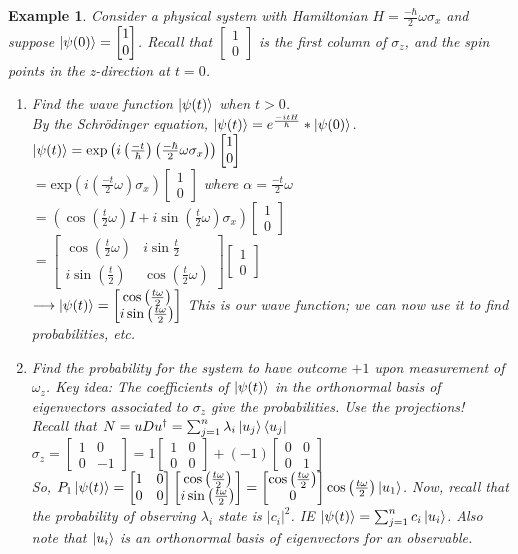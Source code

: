 \documentclass[12pt]{article}
\theoremstyle{plain}
\theoremstyle{nonumberplain}
\theoremstyle{plain}
\newtheorem{example}[lemma]{Example}
\theoremstyle{nonumberplain}
\newcommand\1{{\bf 1}}
\newcommand{\bmat}[1]{\begin{bmatrix*} #1 \end{bmatrix*}} %
\newcommand{\<}{\left\langle}
\renewcommand{\>}{\right\rangle}
\newcommand{\sinx}[1]{\sin\left(#1\right)}
\newcommand{\cosx}[1]{\cos\left(#1\right)}
\begin{document}
\begin{example}
Consider a physical system with Hamiltonian $H=\frac{-\hbar}{2}\omega\sigma_x$ and suppose $\ket{\psi(0)}=\bmat{ 1 \\ 0}$.  Recall that $\bmat{ 1 \\ 0}$ is the first column of $\sigma_z$, and the spin points in the z-direction at $t=0$.
\begin{enumerate}[label=(\alph*)]
\item Find the wave function $\ket{\psi(t)}$ when $t>0$. \\
By the Schrödinger equation, $\ket{\psi(t)}=e^{\frac{-itH}{\hbar}}*\ket{\psi(0)}$.\\
$\ket{\psi(t)}=\text{exp}\left( i\left( \frac{-t}{\hbar}\right) \left( \frac{-\hbar}{2}\omega\sigma_x\right) \right)\bmat{1 \\ 0}$ \\
$=\text{exp}\left( i\left( \frac{-t}{2}\omega\right) \sigma_x \right)\bmat{1 \\ 0}$ where $\alpha=\frac{-t}{2}\omega$ \\
$=\left(\cos\left(\frac{t}{2}\omega\right) I+i\sin\left( \frac{t}{2} \omega \right) \sigma_x \right)\bmat{1 \\ 0}$ \\
$=\bmat{\cosx{\frac{t}{2}\omega} & i\sin{\frac{t}{2}} \\ i\sinx{\frac{t}{2}} & \cosx{\frac{t}{2}\omega}}\bmat{1 \\ 0}$ \\
$\longrightarrow\ket{\psi(t)}=\bmat{\cosx{\frac{t\omega}{2}} \\ i\sinx{\frac{t\omega}{2}}}$ This is our wave function; we can now use it to find probabilities, etc.
\item Find the probability for the system to have outcome $+1$ upon measurement of $\omega_z$. Key idea: The coefficients of $\ket{\psi(t)}$ in the orthonormal basis of eigenvectors associated to $\sigma_z$ give the probabilities. \textit{Use the projections!} \\
Recall that $N=uDu^\dagger=\sum^n_{j=1}\lambda_i\ket{u_j}\bra{u_j}$ \\
$\sigma_z=\bmat{1 & 0 \\ 0 & -1}=1\bmat{1 & 0 \\ 0 & 0}+(-1)\bmat{0 & 0 \\ 0 & 1}$ \\
So, $P_1\ket{\psi(t)}=\bmat{1 & 0 \\ 0 & 0}\bmat{\cosx{\frac{t\omega}{2}} \\ i\sinx{\frac{t\omega}{2}}}=\bmat{\cosx{\frac{t\omega}{2}} \\ 0}\cosx{\frac{t\omega}{2}}\ket{u_1}$. Now, recall that the probability of observing $\lambda_i$ state is $\vert c_i\vert^2$. IE $\ket{\psi(t)}=\sum^n_{j=1}c_i\ket{u_i}$. Also note that $\ket{u_i}$ is an orthonormal basis of eigenvectors for an observable. \\

\end{enumerate}
\end{example}
\end{document}
